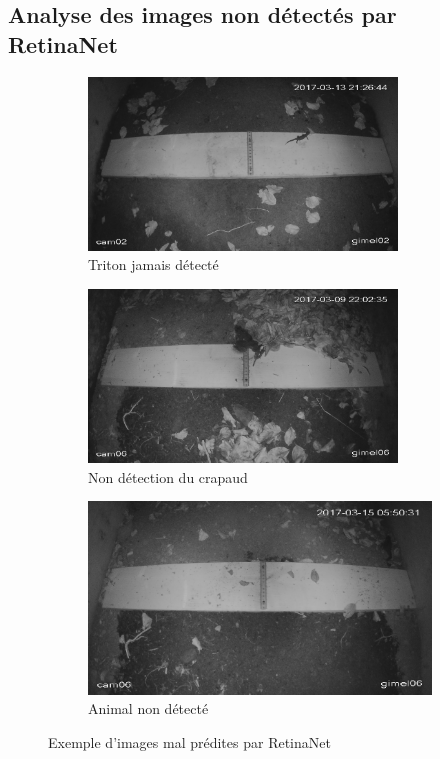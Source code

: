 \subsection{Analyse des images non détectés par RetinaNet}
\begin{figure}[H]
    \centering
    \begin{subfigure}[h]{0.49\textwidth}
        \centering
        \includegraphics[width=0.9\textwidth]{images/failed_pred3_retina.png}
        \caption{Triton jamais détecté}
        \label{fig:eval_retina_a}
    \end{subfigure}
    \begin{subfigure}[h]{0.49\textwidth}
        \centering
        \includegraphics[width=0.9\textwidth]{images/failed_pred5_retina_big.png}
        \caption{Non détection du crapaud}
        \label{fig:eval_retina_b}
    \end{subfigure}
    \begin{subfigure}[h]{0.7\textwidth}
        \centering
        \includegraphics[width=0.9\linewidth]{images/failed_pred4_retina.png}
        \caption{Animal non détecté}
        \label{fig:eval_retina_c}
    \end{subfigure}
    \caption{Exemple d'images mal prédites par RetinaNet}
    \label{fig:failed_pred_retina}
\end{figure}
